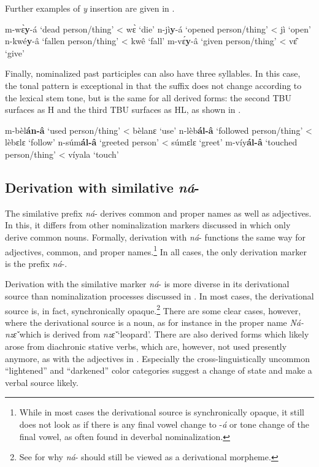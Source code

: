 \noindent Further examples of {\itshape y} insertion are given in .

\ea \label{NomPart5}
\ea  m-wɛ̀{\bfseries y}-á `dead person/thing' < wɛ̀ `die'
\ex n-jì{\bfseries y}-á `opened person/thing' < jì `open'
\ex n-kwé{\bfseries y}-â `fallen person/thing' < kwê `fall'
\ex m-vɛ́{\bfseries y}-â `given person/thing' < vɛ̂ `give'
\z
\z


Finally, nominalized past participles can also have three syllables. In this case,  the tonal pattern is exceptional in that the suffix does not change according to the lexical stem tone, but is the same for all derived forms: the second TBU surfaces as H and the third TBU surfaces as HL, as shown in .

\ea \label{NomPart6}
\ea  m-bèl{\bfseries án-â} `used person/thing' < bèlanɛ `use'
\ex n-lèb{\bfseries ál-â} `followed person/thing' < lèbɛlɛ `follow'
\ex n-súm{\bfseries ál-â} `greeted person' < súmɛlɛ `greet'
\ex m-víy{\bfseries ál-â} `touched person/thing' < víyala `touch'
\z
\z




\subsection{Derivation with similative {\itshape ná}-}
\label{sec:NOMSIM}

The similative prefix {\itshape ná}- derives common and proper names as well as adjectives. In this, it differs from other nominalization markers discussed in  which only derive common nouns. Formally, derivation with {\itshape ná}- functions the same way for adjectives, common, and proper names.\footnote{While in most cases the derivational source is synchronically opaque, it still does not look as if there is any final vowel change to -{\itshape á} or tone change of the final vowel, as often found in deverbal nominalization.} In all cases, the only derivation marker is the prefix {\itshape ná}-. 

Derivation with the similative marker {\itshape ná}- is more diverse in its derivational source than nominalization processes discussed in . In most cases, the der\-i\-va\-tional source is, in fact, synchronically opaque.\footnote{See  for why {\itshape ná}- should still be viewed as a derivational morpheme.} There are some clear cases, however, where the derivational source is a noun, as for instance in the proper name {\itshape Ná-nzɛ̌} which is derived from  {\itshape nzɛ̌} `leopard'.
There are also derived forms which likely arose from diachronic stative verbs, which are,  however, not used presently anymore, as with the adjectives in . Especially the cross-linguistically uncommon ``lightened'' and ``darkened'' color categories suggest a change of state and make a verbal source likely.


